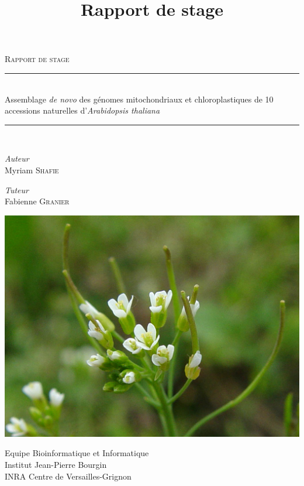 \documentclass[a4paper]{article}
\title{Rapport de stage}
\newcommand{\HRule}{\rule{\linewidth}{0.5mm}}
\begin{document}
\begin{titlepage}

\begin{center}

\thispagestyle{plain}

{ \Huge \textsc{Rapport de stage}\  \\[0.4cm] }
\HRule \\[0.4cm]
{ \Large Assemblage \textit{de novo} des génomes mitochondriaux et chloroplastiques de 10 accessions naturelles d'\textit{Arabidopsis thaliana}  \\[0.4cm] }
\HRule \\[0.4cm]

\vspace{1.5cm}

\begin{minipage}{0.4\textwidth}
\begin{flushleft} \large
\emph{Auteur}\\
Myriam \textsc{Shafie}
\end{flushleft}
\end{minipage}
\begin{minipage}{0.4\textwidth}
\begin{flushright} \large
\emph{Tuteur} \\
Fabienne \textsc{Granier}
\end{flushright}
\end{minipage}

\vspace{3cm}

\includegraphics[scale=0.2]{Titre/a_thaliana.jpg}

\vspace{3cm}

Equipe Bioinformatique et Informatique \\[0.2cm]
Institut Jean-Pierre Bourgin \\[0.2cm]
INRA Centre de Versailles-Grignon


\end{center}

\end{titlepage}
\end{document}
